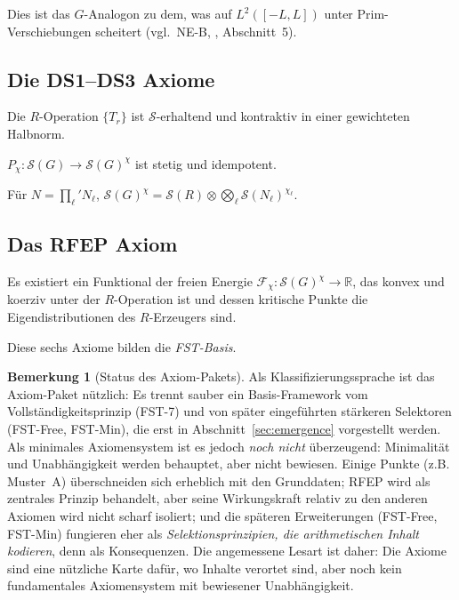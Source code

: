 \documentclass[11pt,a4paper]{article}
\theoremstyle{plain}
\theoremstyle{definition}
\newtheorem{remark}[theorem]{Bemerkung}
\newcommand{\R}{\mathbb{R}}
\renewcommand{\S}{\mathcal{S}}
\newcommand{\chifn}{\chi}
\begin{document}
Dies ist das $G$-Analogon zu dem, was auf $L^2([-L, L])$ unter
Prim-Verschiebungen scheitert (vgl.~NE-B, \cite{Geiger2026RHII}, Abschnitt~5).

\subsection{Die DS1--DS3 Axiome}

\begin{description}[style=nextline]
\item[(DS1) \textit{Dissipation.}] Die $R$-Operation
  $\{T_r\}$ ist $\S$-erhaltend und kontraktiv in einer gewichteten Halbnorm.
\item[(DS2) \textit{Selektion.}] $P_\chifn : \S(G) \to
  \S(G)^\chifn$ ist stetig und idempotent.
\item[(DS3) \textit{Reproduktion.}] Für $N = \prod_\ell' N_\ell$,
  $\S(G)^\chifn = \S(R) \otimes \bigotimes_\ell \S(N_\ell)^{\chifn_\ell}$.
\end{description}

\subsection{Das RFEP Axiom}

\begin{description}[style=nextline]
\item[(RFEP)] Es existiert ein Funktional der freien Energie
  $\mathcal F_\chifn : \S(G)^\chifn \to \R$, das konvex und koerziv
  unter der $R$-Operation ist und dessen kritische Punkte die
  Eigendistributionen des $R$-Erzeugers sind.
\end{description}

Diese sechs Axiome bilden die \emph{FST-Basis}.

\begin{remark}[Status des Axiom-Pakets]
\label{rem:axioms-status}
Als Klassifizierungssprache ist das Axiom-Paket nützlich: Es trennt sauber ein Basis-Framework vom Vollständigkeitsprinzip (FST-7) und von später eingeführten stärkeren Selektoren (FST-Free, FST-Min), die erst in Abschnitt~\ref{sec:emergence} vorgestellt werden. Als minimales Axiomensystem ist es jedoch \emph{noch nicht} überzeugend: Minimalität und Unabhängigkeit werden behauptet, aber nicht bewiesen. Einige Punkte (z.B. Muster~A) überschneiden sich erheblich mit den Grunddaten; RFEP wird als zentrales Prinzip behandelt, aber seine Wirkungskraft relativ zu den anderen Axiomen wird nicht scharf isoliert; und die späteren Erweiterungen (FST-Free, FST-Min) fungieren eher als \emph{Selektionsprinzipien, die arithmetischen Inhalt kodieren}, denn als Konsequenzen. Die angemessene Lesart ist daher: Die Axiome sind eine nützliche Karte dafür, wo Inhalte verortet sind, aber noch kein fundamentales Axiomensystem mit bewiesener Unabhängigkeit.
\end{remark}
\end{document}
